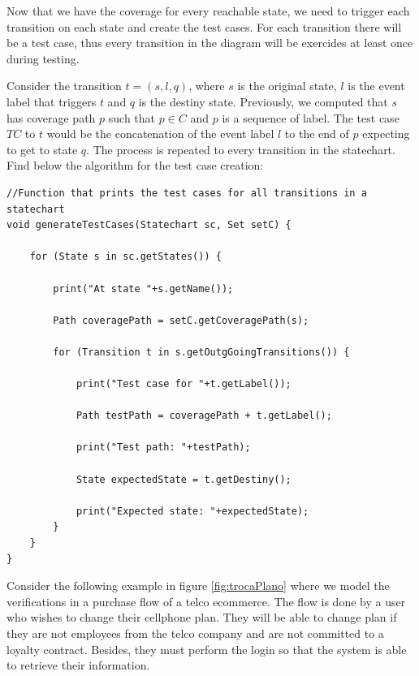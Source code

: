 Now that we have the coverage for every reachable state, we need to trigger each transition on each state and create the test cases. For each transition there will be a test case, thus every transition in the diagram will be exercides at least once during testing.

Consider the transition $t = (s,l,q)$, where $s$ is the original state, $l$ is the event label that triggers $t$ and $q$ is the destiny state. Previously, we computed that $s$ has coverage path $p$ such that $p \in C$ and $p$ is a sequence of label. The test case $TC$ to $t$ would be the concatenation of the event label $l$ to the end of $p$ expecting to get to state $q$. The process is repeated to every transition in the statechart. Find below the algorithm for the test case creation:

\begin{lstlisting}[label={pseudocodeTestCase}]
//Function that prints the test cases for all transitions in a statechart
void generateTestCases(Statechart sc, Set setC) {

	for (State s in sc.getStates()) {
	
		print("At state "+s.getName());

		Path coveragePath = setC.getCoveragePath(s);

		for (Transition t in s.getOutgGoingTransitions()) {

			print("Test case for "+t.getLabel());

			Path testPath = coveragePath + t.getLabel();

			print("Test path: "+testPath);

			State expectedState = t.getDestiny();

			print("Expected state: "+expectedState);
		}
	}
}
\end{lstlisting}


Consider the following example in figure \ref{fig:trocaPlano} where we model the verifications in a purchase flow of a telco ecommerce. The flow is done by a user who wishes to change their cellphone plan. They will be able to change plan if they are not employees from the telco company and are not committed to a loyalty contract. Besides, they must perform the login so that the system is able to retrieve their information.

